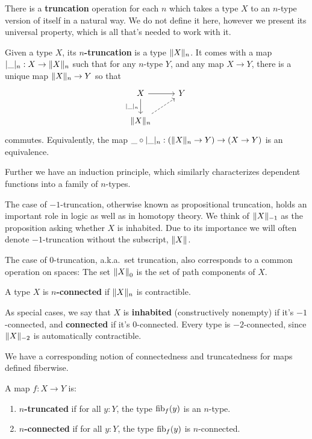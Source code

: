 \documentclass[10pt,oneside,leqno,openright]{memoir}
\begin{document}
\begin{definition}
    There is a \textbf{truncation} operation for each $n$ which takes a type $X$ to an $n$-type version of itself in a natural way.
    We do not define it here, however we present its universal property, which is all that's needed to work with it.

    Given a type $X$, its \textbf{$n$-truncation} is a type $\lVert X\rVert_n$.
    It comes with a map $\lvert\_\rvert_n : X \to \lVert X\rVert_n$ such that for any $n$-type $Y$, and any map $X \to Y$, there is a unique map $\lVert X\rVert_n \to Y$ so that
    \[\begin{tikzcd}
        X  \ar[r] \ar[d, swap, "\trunc{\blank}_n"] & Y \\
        \Trunc{X}_n \ar[ur,dashed]
      \end{tikzcd}\] commutes. Equivalently, the map
    $\_\circ\lvert\_\rvert_n : (\lVert X\rVert_n \to Y) \to (X \to Y)$ is an
    equivalence.

    Further we have an induction principle, which similarly
    characterizes dependent functions into a family of $n$-types.
\end{definition}

The case of $-1$-truncation, otherwise known as propositional truncation, holds an important role in logic as well as in homotopy theory.
We think of $\lVert X\rVert_{-1}$ as the proposition asking whether $X$ is inhabited.
Due to its importance we will often denote $-1$-truncation without the subscript, $\lVert X\rVert$.

The case of $0$-truncation, a.k.a.\ set truncation, also corresponds to a common operation on spaces: The set ${\lVert X\rVert}_0$ is the set of path components of $X$.

\begin{definition}
    A type $X$ is \textbf{$n$-connected} if $\lVert X\rVert_n$ is contractible.
\end{definition}

As special cases, we say that $X$ is \textbf{inhabited} (constructively
nonempty) if it's $-1$-connected, and \textbf{connected} if it's $0$-connected.
Every type is $-2$-connected, since $\lVert X\rVert_{-2}$ is automatically contractible.

We have a corresponding notion of connectedness and truncatedness for maps defined fiberwise.
\begin{definition}
    A map $f : X \to Y$ is:
    \begin{enumerate}
        \item \textbf{$n$-truncated} if for all $y : Y$, the type $\operatorname{fib}_f(y)$ is an $n$-type.
        \item \textbf{$n$-connected} if for all $y : Y$, the type $\operatorname{fib}_f(y)$ is $n$-connected.
    \end{enumerate}
\end{definition}
\end{document}
